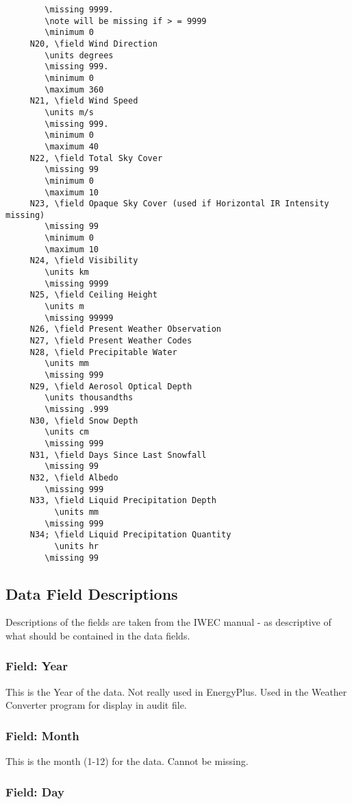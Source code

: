 \begin{lstlisting}
        \missing 9999.
        \note will be missing if > = 9999
        \minimum 0
     N20, \field Wind Direction
        \units degrees
        \missing 999.
        \minimum 0
        \maximum 360
     N21, \field Wind Speed
        \units m/s
        \missing 999.
        \minimum 0
        \maximum 40
     N22, \field Total Sky Cover
        \missing 99
        \minimum 0
        \maximum 10
     N23, \field Opaque Sky Cover (used if Horizontal IR Intensity missing)
        \missing 99
        \minimum 0
        \maximum 10
     N24, \field Visibility
        \units km
        \missing 9999
     N25, \field Ceiling Height
        \units m
        \missing 99999
     N26, \field Present Weather Observation
     N27, \field Present Weather Codes
     N28, \field Precipitable Water
        \units mm
        \missing 999
     N29, \field Aerosol Optical Depth
        \units thousandths
        \missing .999
     N30, \field Snow Depth
        \units cm
        \missing 999
     N31, \field Days Since Last Snowfall
        \missing 99
     N32, \field Albedo
        \missing 999
     N33, \field Liquid Precipitation Depth
          \units mm
        \missing 999
     N34; \field Liquid Precipitation Quantity
          \units hr
        \missing 99
\end{lstlisting}

\subsection{Data Field Descriptions}\label{data-field-descriptions}

Descriptions of the fields are taken from the IWEC manual - as descriptive of what should be contained in the data fields.

\subsubsection{Field: Year}\label{field-year}

This is the Year of the data. Not really used in EnergyPlus. Used in the Weather Converter program for display in audit file.

\subsubsection{Field: Month}\label{field-month}

This is the month (1-12) for the data. Cannot be missing.

\subsubsection{Field: Day}\label{field-day}

